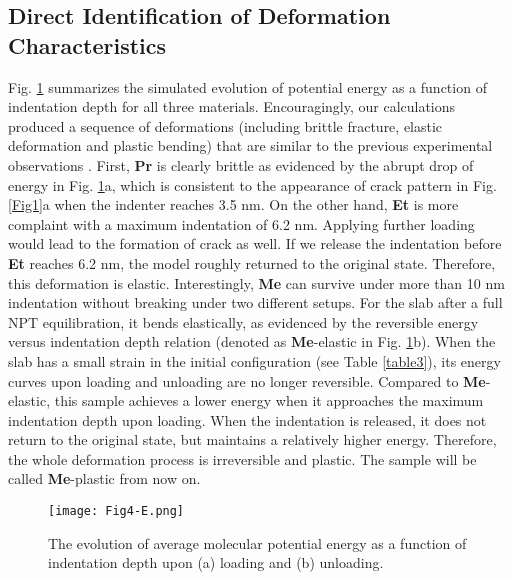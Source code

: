 \documentclass[prb,superscriptaddress,longbibliography, twocolumn]{revtex4-1}
\begin{document}
\subsection{Direct Identification of Deformation Characteristics}
Fig. \ref{Fig4} summarizes the simulated evolution of potential energy as a function of indentation depth for all three materials. Encouragingly, our calculations produced a sequence of deformations (including brittle fracture, elastic deformation and plastic bending) that are similar to the previous experimental observations \cite{devarapalli2019remarkably}. First, \textbf{Pr} is clearly brittle as evidenced by the abrupt drop of energy in Fig. \ref{Fig4}a, which is consistent to the appearance of crack pattern in Fig. \ref{Fig1}a when the indenter reaches 3.5 nm. On the other hand, \textbf{Et} is more complaint with a maximum indentation of 6.2 nm. Applying further loading would lead to the formation of crack as well. If we release the indentation before \textbf{Et} reaches 6.2 nm, the model roughly returned to the original state. Therefore, this deformation is elastic. Interestingly, \textbf{Me} can survive under more than 10 nm indentation without breaking under two different setups. For the slab after a full NPT equilibration, it bends elastically, as evidenced by the reversible energy versus indentation depth relation (denoted as \textbf{Me}-elastic in Fig. \ref{Fig4}b). When the slab has a small strain in the initial configuration (see Table \ref{table3}), its energy curves upon loading and unloading are no longer reversible. Compared to \textbf{Me}-elastic, this sample achieves a lower energy when it approaches the maximum indentation depth upon loading. When the indentation is released, it does not return to the original state, but maintains a relatively higher energy. Therefore, the whole deformation process is irreversible and plastic. The sample will be called \textbf{Me}-plastic from now on. %

\begin{figure}[ht]
\centering
\texttt{[image: Fig4-E.png]}
\caption{\label{Fig4} The evolution of average molecular potential energy as a function of indentation depth upon (a) loading and (b) unloading. %
}
\end{figure}
\end{document}

